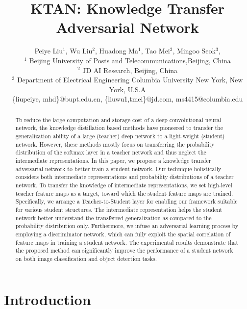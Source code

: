 \documentclass[letterpaper]{article} %
\begin{document}
\title{KTAN: Knowledge Transfer Adversarial Network}
\author{
Peiye Liu$^1$, 
Wu Liu$^2$, 
Huadong Ma$^1$,
Tao Mei$^2$, 
Mingoo Seok$^3$,
\\
$^1$ Beijing University of Posts and Telecommunications,Beijing, China\\
$^2$ JD AI Research, Beijing, China\\
$^3$ Department of Electrical Engineering Columbia University New York, New York, U.S.A  \\
%
\{liupeiye, mhd\}@bupt.edu.cn,
\{liuwu1,tmei\}@jd.com,
ms4415@columbia.edu
}
\maketitle

\begin{abstract}
	To reduce the large computation and storage cost of a deep convolutional neural network, the knowledge distillation based methods have pioneered to transfer the generalization ability of a large (teacher) deep network to a light-weight (student) network.
	However, these methods mostly focus on transferring the probability distribution of the softmax layer in a teacher network and thus neglect the intermediate representations.
	In this paper, we propose a knowledge transfer adversarial network to better train a student network. Our technique holistically considers both intermediate representations and probability distributions of a teacher network.
	To transfer the knowledge of intermediate representations, we set high-level teacher feature maps as a target, toward which the student feature maps are trained.
	Specifically, we arrange a Teacher-to-Student layer for enabling our framework suitable for various student structures.
	The intermediate representation helps the student network better understand the transferred generalization as compared to the probability distribution only.
	Furthermore, we infuse an adversarial learning process by employing a discriminator network, which can fully exploit the spatial correlation of feature maps in training a student network.
	The experimental results demonstrate that the proposed method can significantly %
	improve the performance of a student network on both image classification and object detection tasks.
\end{abstract}

\section{Introduction}
\end{document}
